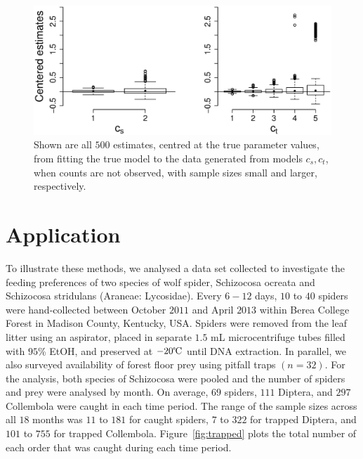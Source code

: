 \documentclass[smallextended]{svjour3}
\begin{document}
\begin{figure}
  \centering
  \includegraphics[scale=0.5]{em_bp}
  \caption{Shown are all $500$ estimates, centred at the true parameter values, from fitting the true model to the data generated from models $c_s,c_t$, when counts are not observed, with sample sizes small and larger, respectively.}
  \label{fig:em_bp}
\end{figure}

\section{Application}
\label{sec:data}

To illustrate these methods, we analysed a data set collected to investigate the feeding preferences of two species of wolf spider, Schizocosa ocreata and Schizocosa stridulans (Araneae: Lycosidae).  Every $6-12$ days, $10$ to $40$ spiders were hand-collected between October $2011$ and April $2013$ within Berea College Forest in Madison County, Kentucky, USA.  Spiders were removed from the leaf litter using an aspirator, placed in separate $1.5$ mL microcentrifuge tubes filled with $95$\% EtOH, and preserved at $-20\celsius$ until DNA extraction.  In parallel, we also surveyed availability of forest floor prey using pitfall traps $(n = 32)$.  For the analysis, both species of Schizocosa were pooled and the number of spiders and prey were analysed by month.  On average, $69$ spiders, $111$ Diptera, and $297$ Collembola were caught in each time period.  The range of the sample sizes across all $18$ months was $11$ to $181$ for caught spiders, $7$ to $322$ for trapped Diptera, and $101$ to $755$ for trapped Collembola.  Figure~\ref{fig:trapped} plots the total number of each order that was caught during each time period.
\end{document}
